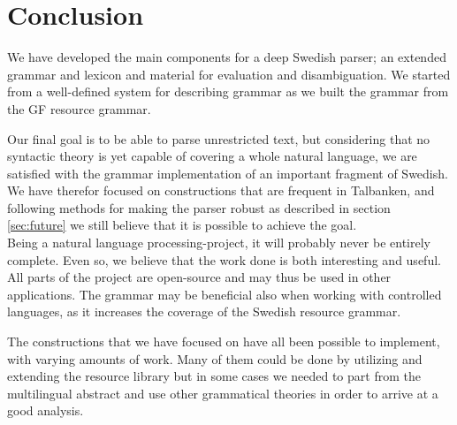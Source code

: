 \documentclass{report}
\begin{document}





\section{Conclusion}


We have developed the main components
for a deep Swedish parser; an extended grammar and lexicon and material for
evaluation and disambiguation. %
We started from a well-defined system for describing grammar as we built
the grammar from the GF resource grammar.


Our final goal is to be able to parse unrestricted text, but considering that
no syntactic theory is yet capable
of covering a whole natural language, we are satisfied with %
the grammar implementation of an important fragment of Swedish.
We have therefor focused on constructions that are frequent in Talbanken, 
and following methods for making the parser robust as described in section \ref{sec:future}
we still believe that it is possible to achieve the goal. 
\\


Being a natural language processing-project, it will probably never be
entirely complete. Even so, we believe  
that the work done is both interesting and useful.
All parts of the project are open-source and may thus be used in other applications.
The grammar may be beneficial also when working with controlled languages,
as it increases the coverage of the Swedish resource grammar.

The constructions
that we have focused on have all been possible to implement, with varying  amounts
of work. Many of them could be done by utilizing and extending the resource library
but in some cases we needed to part from the multilingual abstract and use other
grammatical theories in order to arrive at a good analysis.
\end{document}
